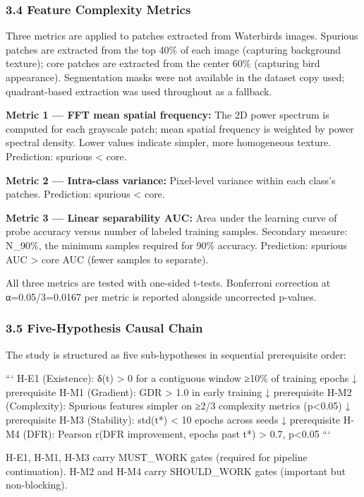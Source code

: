 \subsubsection{3.4 Feature Complexity Metrics}

Three metrics are applied to patches extracted from Waterbirds images. Spurious patches are extracted from the top 40\% of each image (capturing background texture); core patches are extracted from the center 60\% (capturing bird appearance). Segmentation masks were not available in the dataset copy used; quadrant-based extraction was used throughout as a fallback.

\textbf{Metric 1 — FFT mean spatial frequency:} The 2D power spectrum is computed for each grayscale patch; mean spatial frequency is weighted by power spectral density. Lower values indicate simpler, more homogeneous texture. Prediction: spurious < core.

\textbf{Metric 2 — Intra-class variance:} Pixel-level variance within each class's patches. Prediction: spurious < core.

\textbf{Metric 3 — Linear separability AUC:} Area under the learning curve of probe accuracy versus number of labeled training samples. Secondary measure: N\_90\%, the minimum samples required for 90\% accuracy. Prediction: spurious AUC > core AUC (fewer samples to separate).

All three metrics are tested with one-sided t-tests. Bonferroni correction at α=0.05/3=0.0167 per metric is reported alongside uncorrected p-values.

\subsubsection{3.5 Five-Hypothesis Causal Chain}

The study is structured as five sub-hypotheses in sequential prerequisite order:

```
H-E1 (Existence):    δ(t) > 0 for a contiguous window ≥10\% of training epochs
     ↓ prerequisite
H-M1 (Gradient):     GDR > 1.0 in early training
     ↓ prerequisite
H-M2 (Complexity):   Spurious features simpler on ≥2/3 complexity metrics (p<0.05)
     ↓ prerequisite
H-M3 (Stability):    std(t*) < 10 epochs across seeds
     ↓ prerequisite
H-M4 (DFR):          Pearson r(DFR improvement, epochs past t*) > 0.7, p<0.05
```

H-E1, H-M1, H-M3 carry MUST\_WORK gates (required for pipeline continuation). H-M2 and H-M4 carry SHOULD\_WORK gates (important but non-blocking).


